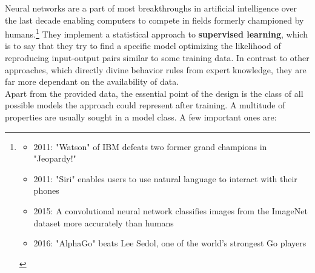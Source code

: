 Neural networks are a part of most breakthroughs in artificial intelligence over the last decade enabling computers to
compete in fields formerly championed by humans.\footnote{\begin{itemize}[topsep=0pt]
		\item 
		2011: "Watson" of IBM defeats two former grand champions in "Jeopardy!" \cite{lally2011natural}
		\item 
		2011: "Siri" enables users to use natural language to interact with their phones
		\cite{ARON201124}
		\item 
		2015: A convolutional neural network classifies images from the ImageNet dataset more accurately than humans 
		\cite{Russakovsky2015} \cite{He_2015_ICCV}
		\item 
		2016: "AlphaGo" beats Lee Sedol, one of the world's strongest Go players
		\cite{gibney2016google} \cite{silver2017mastering}
	\end{itemize}
} They implement a statistical approach to \textbf{supervised learning},
which is to say that they try to find a specific model optimizing the likelihood of reproducing input-output pairs similar to some training data. In contrast to other approaches, which directly divine behavior rules from expert knowledge, they are far more dependant on the availability of data.\cite{Statistical-ML-Basics}\\
Apart from the provided data, the essential point of the design is the class of all possible models the approach could represent after training. A multitude of properties are usually sought in a model class. A few important ones are:
